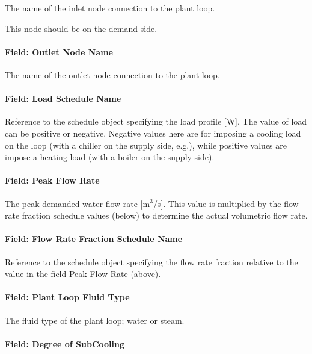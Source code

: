 The name of the inlet node connection to the plant loop.

This node should be on the demand side.

\paragraph{Field: Outlet Node Name}\label{field-outlet-node-name-003}

The name of the outlet node connection to the plant loop.

\paragraph{Field: Load Schedule Name}\label{field-load-schedule-name}

Reference to the schedule object specifying the load profile {[}W{]}.  The value of load can be positive or negative.  Negative values here are for imposing a cooling load on the loop (with a chiller on the supply side, e.g.), while positive values are impose a heating load (with a boiler on the supply side).

\paragraph{Field: Peak Flow Rate}\label{field-peak-flow-rate}

The peak demanded water flow rate {[}m\(^{3}\)/s{]}. This value is multiplied by the flow rate fraction schedule values (below) to determine the actual volumetric flow rate.

\paragraph{Field: Flow Rate Fraction Schedule Name}\label{field-flow-rate-fraction-schedule-name}

Reference to the schedule object specifying the flow rate fraction relative to the value in the field Peak Flow Rate (above).

\paragraph{Field: Plant Loop Fluid Type}\label{field-plant-loop-fluid-type}

The fluid type of the plant loop; water or steam.

\paragraph{Field: Degree of SubCooling}\label{field-degree-of-subcooling-load-profile}

